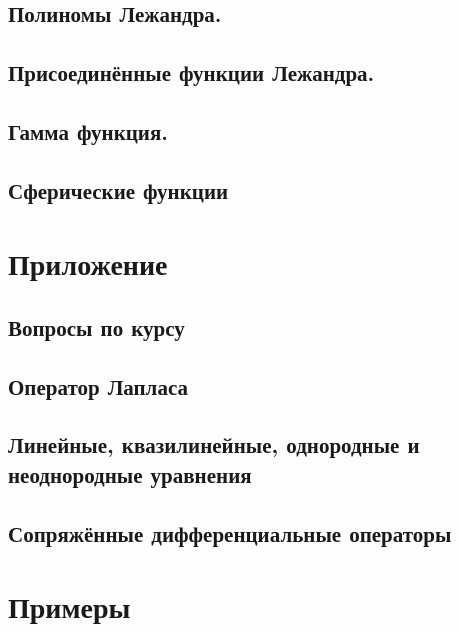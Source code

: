 \documentclass[12pt, a4paper]{article}
\begin{document}
	\subsection{Полиномы Лежандра.}\label{que:27}
		 \newpage

	\subsection{Присоединённые функции Лежандра.}\label{que:29}
		 \newpage

	\subsection{Гамма функция.}\label{que:33}
		 \newpage

	\subsection{Сферические функции}\label{que:34}
		 \newpage

\appendix
\label{appendix}
\section{Приложение}
	\subsection{Вопросы по курсу}
		\newpage
	\subsection{Оператор Лапласа}\label{que:4}
		 \newpage
	\subsection{Линейные, квазилинейные, однородные и неоднородные уравнения}\label{que:5}
		 \newpage
	\subsection{Сопряжённые дифференциальные операторы}\label{que:13}
		 \newpage

\section{Примеры}
\end{document}
